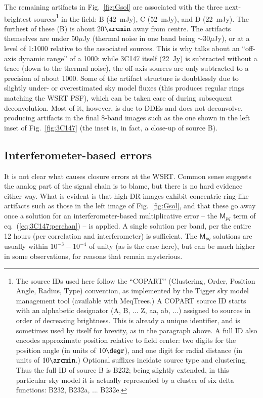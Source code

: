\documentclass[]{aa}
\newcommand{\coh}[2]{\mathsf{{#1}}_{{#2}}}
\begin{document}
The remaining artifacts in Fig.~\ref{fig:Gsol} are associated with the three next-brightest sources\footnote{The source IDs used here follow the ``COPART'' (Clustering, Order, Position Angle, Radius, Type) convention, as implemented by the Tigger sky model management tool (available with MeqTrees.) A COPART source ID starts with an alphabetic designator (A, B, ... Z, aa, ab, ...) assigned to sources in order of decreasing brightness. This is already a unique identifier, and is sometimes used by itself for brevity, as in the paragraph above. A full ID also encodes approximate position relative to field center: two digits for the position angle (in units of $10\degr$), and one digit for radial distance (in units of $10\arcmin$.) Optional suffixes incidate source type and clustering. Thus the full ID of source B is B232; being slightly extended, in this particular sky model it is actually represented by a cluster of six delta functions: B232, B232a, ... B232e.} in 
the field: B (42~mJy), C (52~mJy), and D (22~mJy). The furthest of these (B) is about 20$\arcmin$ away from centre. The artifacts themselves are under $50 \mu$Jy (thermal noise in one band being $\sim 30 \mu$Jy), or at a level of 1:1000 relative to the associated sources. This is why \citet{deBruyn:million} talks about an ``off-axis dynamic range'' of a 1000: while 3C147 itself (22~Jy) is subtracted without a trace (down to the thermal noise), the off-axis sources are only subtracted to a precision of about 1000. Some of the artifact structure is doubtlessly due to slightly under- or overestimated sky model fluxes (this produces regular rings matching the WSRT PSF), which can be taken care of during subsequent deconvolution. Most of it, however, is due to DDEs and does not deconvolve, producing artifacts in the final 8-band images such as the one shown in the left inset of Fig.~\ref{fig:3C147} (the inset is, in fact, a close-up of source B).

\subsection{Interferometer-based errors\label{sec:3C147:closure-errors}}

It is not clear what causes closure errors at the WSRT. Common sense suggests the analog part of the signal chain is to blame, but there is no hard evidence either way. What is evident is that high-DR images exhibit concentric ring-like artifacts such as those in the left image of Fig.~\ref{fig:Gsol}, and that these go away once a solution for an interferometer-based  multiplicative error -- the $\coh{M}{pq}$ term of eq.~(\ref{eq:3C147:perchan}) -- is applied. A single solution per band, per the entire 12 hours (per correlation and interferometer) is sufficient. The $\coh{M}{pq}$ solutions are usually within $10^{-3}-10^{-4}$ of unity (as is the case here), but can be much higher in some observations, for reasons that remain mysterious. 
\end{document}
